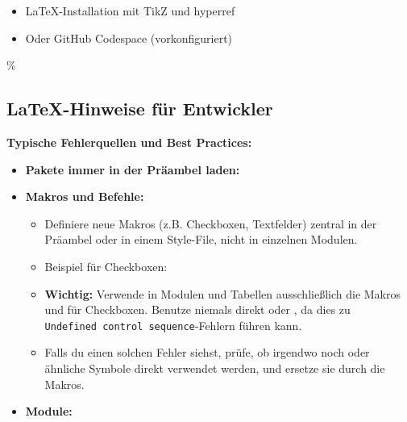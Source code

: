 \begin{itemize}
\tightlist
\item
  LaTeX-Installation mit TikZ und hyperref
\item
  Oder GitHub Codespace (vorkonfiguriert)
\end{itemize}

\hypertarget{latex-hinweise-fuxfcr-entwickler}{\%
\subsection{LaTeX-Hinweise für Entwickler}\label{latex-hinweise-fuxfcr-entwickler}}

\textbf{Typische Fehlerquellen und Best Practices:}

\begin{itemize}
\tightlist
\item
  \textbf{Pakete immer in der Präambel laden:}

\item
  \textbf{Makros und Befehle:}

  \begin{itemize}
  \item
    Definiere neue Makros (z.B. Checkboxen, Textfelder) zentral in der Präambel oder in einem Style-File, nicht in einzelnen Modulen.
  \item
    Beispiel für Checkboxen:

\begin{Shaded}
\end{Shaded}
  \item
    \textbf{Wichtig:} Verwende in Modulen und Tabellen ausschließlich die Makros \texttt{\checkbox} und \texttt{\checkedbox} für Checkboxen. Benutze niemals direkt \texttt{\Box} oder \texttt{\blacksquare}, da dies zu \texttt{Undefined\ control\ sequence}-Fehlern führen kann.
  \item
    Falls du einen solchen Fehler siehst, prüfe, ob irgendwo noch \texttt{\Box} oder ähnliche Symbole direkt verwendet werden, und ersetze sie durch die Makros.
  \end{itemize}
\item
  \textbf{Module:}


\end{itemize}
